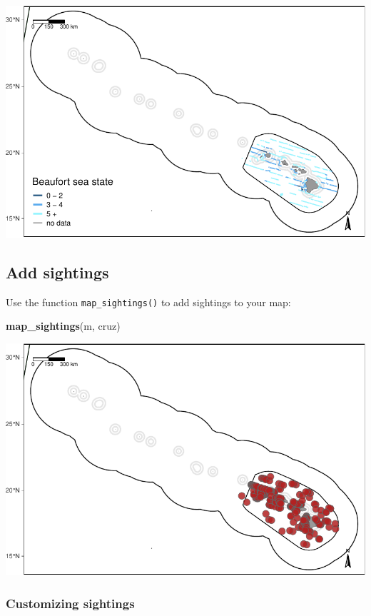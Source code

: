 \documentclass[
]{book}
\newenvironment{Shaded}{\begin{snugshade}}{\end{snugshade}}
\newcommand{\KeywordTok}[1]{\textcolor[rgb]{0.13,0.29,0.53}{\textbf{#1}}}
\newcommand{\NormalTok}[1]{#1}
\begin{document}
\includegraphics{figures/unnamed-chunk-56-1.pdf}

\hypertarget{add-sightings}{%
\subsection*{Add sightings}\label{add-sightings}}

Use the function \texttt{map\_sightings()} to add sightings to your map:

\begin{Shaded}
\begin{Highlighting}[]
\KeywordTok{map_sightings}\NormalTok{(m, cruz)}
\end{Highlighting}
\end{Shaded}

\includegraphics{figures/unnamed-chunk-57-1.pdf}

\hypertarget{customizing-sightings}{%
\subsubsection*{Customizing sightings}\label{customizing-sightings}}
\end{document}
